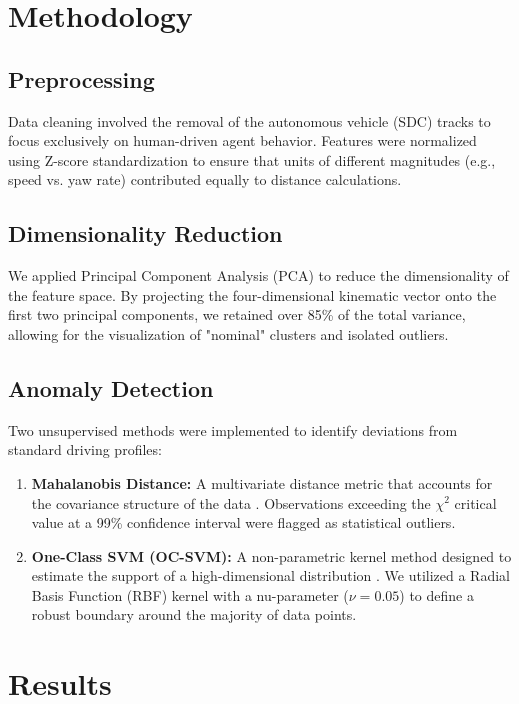 \documentclass[conference]{IEEEtran}
\begin{document}
\section{Methodology}

\subsection{Preprocessing}
Data cleaning involved the removal of the autonomous vehicle (SDC) tracks to focus exclusively on human-driven agent behavior. Features were normalized using Z-score standardization to ensure that units of different magnitudes (e.g., speed vs. yaw rate) contributed equally to distance calculations.

\subsection{Dimensionality Reduction}
We applied Principal Component Analysis (PCA) \cite{jolliffe2002principal} to reduce the dimensionality of the feature space. By projecting the four-dimensional kinematic vector onto the first two principal components, we retained over 85\% of the total variance, allowing for the visualization of "nominal" clusters and isolated outliers.

\subsection{Anomaly Detection}
Two unsupervised methods were implemented to identify deviations from standard driving profiles:
\begin{enumerate}
    \item \textbf{Mahalanobis Distance:} A multivariate distance metric that accounts for the covariance structure of the data \cite{mahalanobis1936generalized}. Observations exceeding the $\chi^2$ critical value at a 99\% confidence interval were flagged as statistical outliers.
    \item \textbf{One-Class SVM (OC-SVM):} A non-parametric kernel method designed to estimate the support of a high-dimensional distribution \cite{scholkopf2001estimating}. We utilized a Radial Basis Function (RBF) kernel with a nu-parameter ($\nu=0.05$) to define a robust boundary around the majority of data points.
\end{enumerate}

\section{Results}
\end{document}
